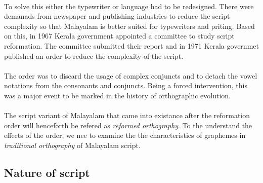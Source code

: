\documentclass[10pt]{article}
\begin{document}
\paragraph{}
To solve this either the typewriter or language had to be redesigned. There were demanads from newspaper and publishing industries to reduce the script complexity so that Malayalam is better suited for typewriters and priting. Based on this, in 1967 Kerala government appointed a committee to study script reformation. The committee submitted their report and in 1971 Kerala governmet published an order to reduce the complexity of the script\cite{1971go}.

\paragraph{}
The order was to discard the usage of complex conjuncts and to detach the vowel notations from the consonants and conjuncts. Being a forced intervention, this was a major event to be marked in the history of orthographic evolution. 

\paragraph{}
The script variant of Malayalam that came into existance after the reformation order will henceforth be refered as \textit{reformed orthography}. To the understand the effects of the order, we nee to examine the the characteristics of graphemes in \textit{traditional orthography} of Malayalam script.

\subsection{Nature of script}
\end{document}
